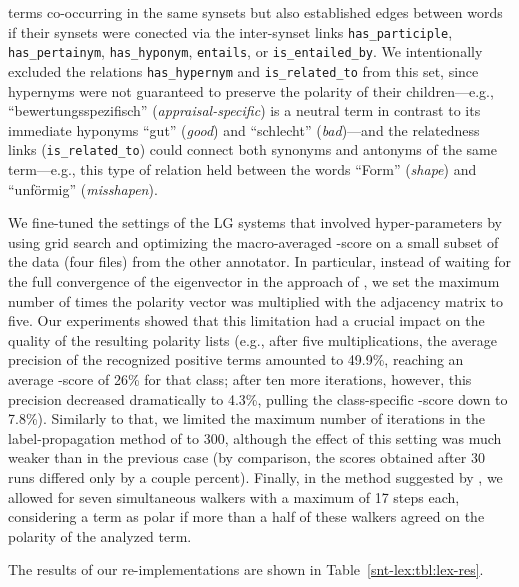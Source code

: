 terms co-occurring in the same synsets but also established edges
between words if their synsets were conected via the inter-synset
links \texttt{has\_participle}, \texttt{has\_pertainym},
\texttt{has\_hyponym}, \texttt{entails}, or \texttt{is\_entailed\_by}.
We intentionally excluded the relations \texttt{has\_hypernym} and
\texttt{is\_related\_to} from this set, since hypernyms were not
guaranteed to preserve the polarity of their children---e.g.,
``bewertungsspezifisch'' (\emph{appraisal-specific}) is a neutral term
in contrast to its immediate hyponyms ``gut'' (\emph{good}) and
``schlecht'' (\emph{bad})---and the relatedness links
(\texttt{is\_related\_to}) could connect both synonyms and antonyms of
the same term---e.g., this type of relation held between the words
``Form'' (\emph{shape}) and ``unf\"ormig'' (\emph{misshapen}).

We fine-tuned the settings of the LG systems that involved
hyper-parameters by using grid search and optimizing the
macro-averaged \F{}-score on a small subset of the data (four files)
from the other annotator.  In particular, instead of waiting for the
full convergence of the eigenvector in the approach of
\citet{Blair-Goldensohn:08}, we set the maximum number of times the
polarity vector was multiplied with the adjacency matrix to five.  Our
experiments showed that this limitation had a crucial impact on the
quality of the resulting polarity lists (e.g., after five
multiplications, the average precision of the recognized positive
terms amounted to 49.9\%, reaching an average \F{}-score of 26\% for
that class; after ten more iterations, however, this precision
decreased dramatically to 4.3\%, pulling the class-specific \F{}-score
down to 7.8\%).  Similarly to that, we limited the maximum number of
iterations in the label-propagation method of \citet{Rao:09} to 300,
although the effect of this setting was much weaker than in the
previous case (by comparison, the scores obtained after 30 runs
differed only by a couple percent).  Finally, in the method suggested
by \citet{Awadallah:10}, we allowed for seven simultaneous walkers
with a maximum of 17 steps each, considering a term as polar if more
than a half of these walkers agreed on the polarity of the analyzed
term.

The results of our re-implementations are shown in
Table~\ref{snt-lex:tbl:lex-res}.

